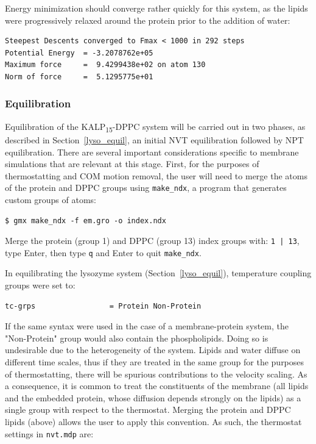 \documentclass[9pt,tutorial]{livecoms}
\begin{document}
Energy minimization should converge rather quickly for this system, as the lipids were progressively relaxed around the protein prior to the addition of water:

\begin{verbatim}
Steepest Descents converged to Fmax < 1000 in 292 steps
Potential Energy  = -3.2078762e+05
Maximum force     =  9.4299438e+02 on atom 130
Norm of force     =  5.1295775e+01
\end{verbatim}

\subsubsection{Equilibration} \label{kalp_equil}

Equilibration of the KALP\textsubscript{15}-DPPC system will be carried out in two phases, as described in Section~\ref{lyso_equil}, an initial NVT equilibration followed by NPT equilibration. There are several important considerations specific to membrane simulations that are relevant at this stage. First, for the purposes of thermostatting and COM motion removal, the user will need to merge the atoms of the protein and DPPC groups using \texttt{make\_ndx}, a program that generates custom groups of atoms:

\begin{verbatim}
$ gmx make_ndx -f em.gro -o index.ndx
\end{verbatim}

Merge the protein (group 1) and DPPC (group 13) index groups with: \texttt{1 | 13}, type Enter, then type \texttt{q} and Enter to quit \texttt{make\_ndx}.

In equilibrating the lysozyme system (Section~\ref{lyso_equil}), temperature coupling groups were set to:

\begin{verbatim}
tc-grps                 = Protein Non-Protein
\end{verbatim}

If the same syntax were used in the case of a membrane-protein system, the "Non-Protein" group would also contain the phospholipids. Doing so is undesirable due to the heterogeneity of the system. Lipids and water diffuse on different time scales, thus if they are treated in the same group for the purposes of thermostatting, there will be spurious contributions to the velocity scaling. As a consequence, it is common to treat the constituents of the membrane (all lipids and the embedded protein, whose diffusion depends strongly on the lipids) as a single group with respect to the thermostat. Merging the protein and DPPC lipids (above) allows the user to apply this convention. As such, the thermostat settings in \texttt{nvt.mdp} are:
\end{document}
